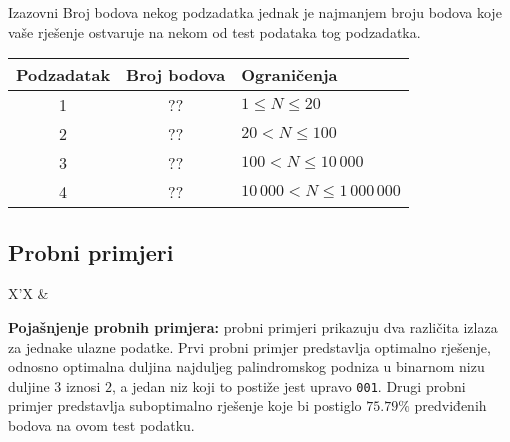 \begin{statement}[
  problempoints=100,
  timelimit=1 sekunda,
  memorylimit=512 MiB,
]{Izazovni}
Broj bodova nekog podzadatka jednak je najmanjem broju bodova koje vaše rješenje
ostvaruje na nekom od test podataka tog podzadatka.

{\renewcommand{\arraystretch}{1.4}
  \setlength{\tabcolsep}{6pt}
  \begin{tabular}{ccl}
 Podzadatak & Broj bodova & Ograničenja \\ \midrule
  1 & ?? & $1 \le N \le 20$ \\
  2 & ?? & $20 < N \le 100$ \\
  3 & ?? & $100 < N \le 10\,000$ \\
  4 & ?? & $10\,000 < N \le 1\,000\,000$ \\
\end{tabular}}

\subsection*{Probni primjeri}
\begin{tabularx}{\textwidth}{X'X}
 &
\end{tabularx}

\textbf{Pojašnjenje probnih primjera:} probni primjeri prikazuju dva
različita izlaza za jednake ulazne podatke. Prvi probni primjer predstavlja
optimalno rješenje, odnosno optimalna duljina najduljeg palindromskog podniza
u binarnom nizu duljine $3$ iznosi $2$, a jedan niz koji to postiže jest upravo
\texttt{001}. Drugi probni primjer predstavlja suboptimalno rješenje koje
bi postiglo $75.79\%$ predviđenih bodova na ovom test podatku.

\end{statement}

